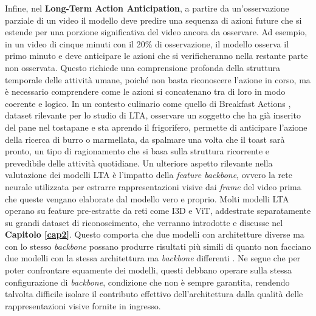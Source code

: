 Infine, nel \textbf{Long-Term Action Anticipation}, a partire da un'osservazione parziale di un video il modello deve predire una sequenza di azioni future che si estende per una porzione significativa del video ancora da osservare.
Ad esempio, in un video di cinque minuti con il 20\% di osservazione, il modello osserva il primo minuto e deve anticipare le azioni che si verificheranno nella restante parte non osservata. Questo richiede una comprensione profonda della struttura temporale delle attività umane, poiché non basta riconoscere l'azione in corso, ma è necessario comprendere come le azioni si concatenano tra di loro in modo coerente e logico. In un contesto culinario come quello di Breakfast Actions \cite{kuehne2014language}, dataset rilevante per lo studio di LTA, osservare un soggetto che ha già inserito del pane nel tostapane e sta aprendo il frigorifero, permette di anticipare l'azione della ricerca di burro o marmellata, da spalmare una volta che il toast sarà pronto, un tipo di ragionamento che si basa sulla struttura ricorrente e prevedibile delle attività quotidiane. Un ulteriore aspetto rilevante nella valutazione dei modelli LTA è l'impatto della \textit{feature backbone}, ovvero la rete neurale utilizzata per estrarre rappresentazioni visive dai \textit{frame} del video prima che queste vengano elaborate dal modello vero e proprio. Molti modelli LTA operano su feature pre-estratte da reti come I3D e ViT, addestrate separatamente su grandi dataset di riconoscimento, che verranno introdotte e discusse nel \textbf{Capitolo \ref{cap2}}. Questo comporta che due modelli con architetture diverse ma con lo stesso \textit{backbone} possano produrre risultati più simili di quanto non facciano due modelli con la stessa architettura ma \textit{backbone} differenti \cite{lai2024human}. Ne segue che per poter confrontare equamente dei modelli, questi debbano operare sulla stessa configurazione di \textit{backbone}, condizione che non è sempre garantita, rendendo talvolta difficile isolare il contributo effettivo dell'architettura dalla qualità delle rappresentazioni visive fornite in ingresso. 
